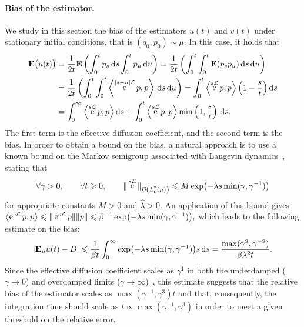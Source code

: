\documentclass[11pt,a4paper]{article}
\DeclareMathOperator{\e}{e}
\newcommand{\expect}[0]{\mathbf{E}}
\renewcommand{\d}{\mathrm d}
\theoremstyle{plain}
\numberwithin{equation}{section}
\renewcommand{\leq}{\leqslant}
\renewcommand{\geq}{\geqslant}
\begin{document}
\paragraph{Bias of the estimator.}%
We study in this section the bias of the estimators $u(t)$ and $v(t)$ under stationary initial conditions,
that is $(q_0, p_0) \sim \mu$.
In this case, it holds that
\begin{align*}
    \expect \bigl(u(t)\bigr)
    &= \frac{1}{2t} \expect \left( \int_{0}^{t} p_s \, \d s \int_{0}^{t} p_u \, \d u \right)
    = \frac{1}{2t} \left( \int_{0}^{t} \int_{0}^{t} \expect (p_s p_u) \, \d s \, \d u \right) \\
    &= \frac{1}{2t} \left( \int_{0}^{t} \int_{0}^{t} \ip{\e^{\abs{s - u} \mathcal L}p}{p} \, \d s \, \d u \right)
    =  \int_{0}^{t} \ip{\e^{s \mathcal L}p}{p} \left(1 - \frac{s}{t}\right) \d s  \\
    &= \int_{0}^{\infty} \ip{\e^{s \mathcal L}p}{p}  \d s + \int_{0}^{t} \ip{\e^{s \mathcal L}p}{p} \min\left(1, \frac{s}{t}\right) \, \d s.
\end{align*}
The first term is the effective diffusion coefficient,
and the second term is the bias.
In order to obtain a bound on the bias,
a natural approach is to use a known bound on the Markov semigroup associated with Langevin dynamics~\cite{roussel2018spectral},
stating that
\[
    \forall \gamma > 0, \qquad \forall t \geq 0, \qquad
    \norm*{ \e^{s \mathcal L} }[\mathcal B \left(L^2_0\left(\mu\right) \right)] \leq M \exp \bigl(- \lambda s \min(\gamma, \gamma^{-1}) \bigr)
\]
for appropriate constants $M > 0$ and $\hat \lambda > 0$.
An application of this bound gives
\(
    \ip{\e^{s \mathcal L}p}{p} \leq \norm*{\e^{s \mathcal L}p} \norm*{p} \leq \beta^{-1} \exp\bigl(- \lambda s \min(\gamma, \gamma^{-1})\bigr),
\)
which leads to the following estimate on the bias:
\begin{equation}
    \label{eq:bias}
    \abs{\expect_{\mu} u(t) - D}
    \leq \frac{1}{\beta t}\int_{0}^{\infty} \exp\bigl(- \lambda s \min(\gamma, \gamma^{-1})\bigr) s \, \d s
    = \frac{\max (\gamma^2, \gamma^{-2})}{\beta \lambda^2 t}.
\end{equation}
Since the effective diffusion coefficient scales as $\gamma^1$ in both the underdamped ($\gamma \to 0$) and overdamped limits ($\gamma \to \infty$)~\cite{MR2394704,MR2427108},
this estimate suggests that the relative bias of the estimator scales as $\max(\gamma^{-1}, \gamma^3) t$ and that,
consequently, the integration time should scale as $t \propto \max(\gamma^{-1}, \gamma^3)$ in order to meet a given threshold on the relative error.
\end{document}
